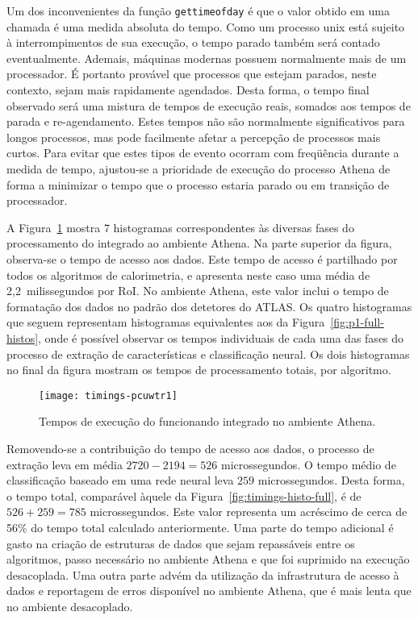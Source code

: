 Um dos inconvenientes da função \texttt{gettimeofday} é que o valor obtido em
uma chamada é uma medida absoluta do tempo. Como um processo unix está sujeito
à interrompimentos de sua execução, o tempo parado também será contado
eventualmente. Ademais, máquinas modernas possuem normalmente mais de um
processador. É portanto provável que processos que estejam parados, neste
contexto, sejam mais rapidamente agendados. Desta forma, o tempo final
observado será uma mistura de tempos de execução reais, somados aos tempos de
parada e re-agendamento. Estes tempos não são normalmente significativos para
longos processos, mas pode facilmente afetar a percepção de processos mais
curtos. Para evitar que estes tipos de evento ocorram com freqüência durante
a medida de tempo, ajustou-se a prioridade de execução do processo Athena de
forma a minimizar o tempo que o processo estaria parado ou em transição de
processador.

A Figura~\ref{fig:timings-athena} mostra 7 histogramas correspondentes às
diversas fases do processamento do  integrado ao ambiente
Athena. Na parte superior da figura, observa-se o tempo de acesso aos
dados. Este tempo de acesso é partilhado por todos os algoritmos de
calorimetria, e apresenta neste caso uma média de 2,2~milissegundos por
RoI. No ambiente Athena, este valor inclui o tempo de formatação dos dados no
padrão dos detetores do ATLAS. Os quatro histogramas que seguem representam
histogramas equivalentes aos da Figura~\ref{fig:p1-full-histos}, onde é
possível observar os tempos individuais de cada uma das fases do processo de
extração de características e classificação neural. Os dois histogramas no
final da figura mostram os tempos de processamento totais, por algoritmo.

\begin{figure}
\begin{center}
\texttt{[image: timings-pcuwtr1]}
\end{center}
\caption{Tempos de execução do  funcionando integrado no
ambiente Athena.}
\label{fig:timings-athena}
\end{figure}

Removendo-se a contribuição do tempo de acesso aos dados, o processo de
extração leva em média $2720-2194=526$ microssegundos. O tempo médio de
classificação baseado em uma rede neural leva $259$ microssegundos. Desta
forma, o tempo total, comparável àquele da
Figura~\ref{fig:timings-histo-full}, é de $526+259=785$ microssegundos. Este
valor representa um acréscimo de cerca de 56\% do tempo total calculado
anteriormente. Uma parte do tempo adicional é gasto na criação de estruturas
de dados que sejam repassáveis entre os algoritmos, passo necessário no
ambiente Athena e que foi suprimido na execução desacoplada. Uma outra parte
advém da utilização da infrastrutura de acesso à dados e reportagem de erros
disponível no ambiente Athena, que é mais lenta que no ambiente desacoplado.

